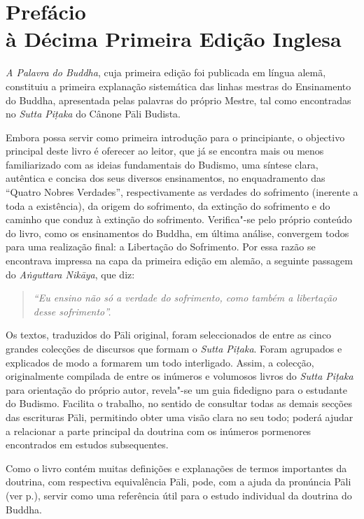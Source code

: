\chapter[Prefácio à Décima Primeira Edição Inglesa]{Prefácio\\ à Décima Primeira Edição Inglesa}

\emph{A Palavra do Buddha}, cuja primeira edição foi publicada em língua alemã,
constituiu a primeira explanação sistemática das linhas mestras do Ensinamento
do Buddha, apresentada pelas palavras do próprio Mestre, tal como encontradas no
\emph{Sutta Piṭaka} do Cânone Pāli Budista.

Embora possa servir como primeira introdução para o principiante, o objectivo
principal deste livro é oferecer ao leitor, que já se encontra mais ou menos
familiarizado com as ideias fundamentais do Budismo, uma síntese clara,
autêntica e concisa dos seus diversos ensinamentos, no enquadramento das
“Quatro Nobres Verdades”, respectivamente as verdades do sofrimento (inerente
a toda a existência), da origem do sofrimento, da extinção do sofrimento e do
caminho que conduz à extinção do sofrimento. Verifica"-se pelo próprio conteúdo
do livro, como os ensinamentos do Buddha, em última análise, convergem todos
para uma realização final: a Libertação do Sofrimento. Por essa razão se
encontrava impressa na capa da primeira edição em alemão, a seguinte passagem do
\emph{Aṅguttara Nikāya}, que diz:

\begin{verse}
  \emph{“Eu ensino não só a verdade do sofrimento, como também a libertação
    desse sofrimento”.}
\end{verse}

Os textos, traduzidos do Pāli original, foram seleccionados de entre as cinco
grandes colecções de discursos que formam o \emph{Sutta Piṭaka}. Foram agrupados
e explicados de modo a formarem um todo interligado. Assim, a colecção,
originalmente compilada de entre os inúmeros e volumosos livros do \emph{Sutta
  Piṭaka} para orientação do próprio autor, revela"-se um guia fidedigno para o
estudante do Budismo. Facilita o trabalho, no sentido de consultar todas as
demais secções das escrituras Pāli, permitindo obter uma visão clara no seu
todo; poderá ajudar a relacionar a parte principal da doutrina com os inúmeros
pormenores encontrados em estudos subsequentes.

Como o livro contém muitas definições e explanações de termos importantes da
doutrina, com respectiva equivalência Pāli, pode, com a ajuda da pronúncia Pāli
(ver p.\pageref{pron-pali}), servir como uma referência útil para o estudo individual
da doutrina do Buddha.

